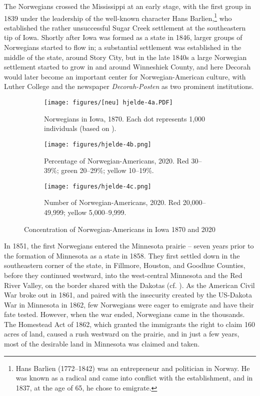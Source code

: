 \documentclass[output=paper]{langscibook}
\begin{document}
The Norwegians crossed the Mississippi at an early stage, with the first group in 1839 under the leadership of the well-known character Hans Barlien,{\footnote{Hans Barlien (1772--1842) was an entrepreneur and politician in Norway. He was known as a radical and came into conflict with the establishment, and in 1837, at the age of 65, he chose to emigrate.}} who established the rather unsuccessful Sugar Creek settlement at the southeastern tip of Iowa. Shortly after Iowa was formed as a state in 1846, larger groups of Norwegians started to flow in; a substantial settlement was established in the middle of the state, around Story City, but in the late 1840s a large Norwegian settlement started to grow in and around Winneshiek County, and here Decorah would later become an important center for Norwegian\hyp American culture, with Luther College and the newspaper \textit{Decorah-Posten} as two prominent institutions. 

\begin{figure}
\begin{subfigure}[t]{.3\textwidth}
\texttt{[image: figures/[neu] hjelde-4a.PDF]} 
\caption{Norwegians in Iowa, 1870. Each dot represents 1,000 individuals (based on \citealt{Qualey1938}).}\label{fig:hjelde:4a}
\end{subfigure}\hfill
\begin{subfigure}[t]{.3\textwidth}
\texttt{[image: figures/hjelde-4b.png]} 
\caption{Percentage of Norwegian\hyp Americans, 2020. Red 30--39\%; green 20--29\%; yellow 10--19\%.}\label{fig:hjelde:4b}
\end{subfigure}\hfill
\begin{subfigure}[t]{.3\textwidth}
\texttt{[image: figures/hjelde-4c.png]} 
\caption{Number of Norwegian\hyp Americans, 2020. Red 20,000--49,999; yellow 5,000--9,999.}\label{fig:hjelde:4c}
\end{subfigure}%
\caption{Concentration of Norwegian-Americans in Iowa 1870 and 2020}
\end{figure}

In 1851, the first Norwegians entered the Minnesota prairie – seven years prior to the formation of Minnesota as a state in 1858. They first settled down in the southeastern corner of the state, in Fillmore, Houston, and Goodhue Counties, before they continued westward, into the west-central Minnesota and the Red River Valley, on the border shared with the Dakotas (cf. ). As the American Civil War broke out in 1861, and paired with the insecurity created by the US-Dakota War in Minnesota in 1862, few Norwegians were eager to emigrate and have their fate tested. However, when the war ended, Norwegians came in the thousands. The Homestead Act of 1862, which granted the immigrants the right to claim 160 acres of land, caused a rush westward on the prairie, and in just a few years, most of the desirable land in Minnesota was claimed and taken. 
\end{document}
